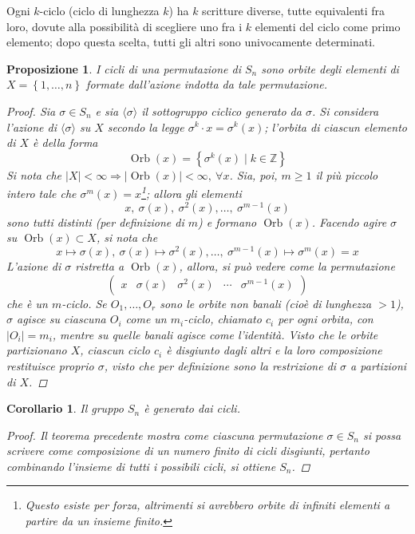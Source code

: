 \documentclass[11pt]{scrartcl}
\theoremstyle{style1}
\newtheorem{prop}{Proposizione}[section]
\newtheorem{corollario}{Corollario}[teorema]
\numberwithin{equation}{subsection}
\begin{document}
Ogni $k$-ciclo (ciclo di lunghezza $k$) ha $k$ scritture diverse, tutte equivalenti fra loro, dovute alla possibilit\`a di scegliere uno fra i $k$ elementi del ciclo come primo elemento; dopo questa scelta, tutti gli altri sono univocamente determinati.
\begin{prop}
	I cicli di una permutazione di $S_n$ sono orbite degli elementi di $X = \left\{ 1,\ldots,n \right\} $ formate dall'azione indotta da tale permutazione.
	\begin{proof}
		Sia $\sigma \in S_n$ e sia $\langle \sigma  \rangle$ il sottogruppo ciclico generato da $\sigma $.
		Si considera l'azione di $\langle \sigma  \rangle$ su $X$ secondo la legge $\sigma ^k \cdot x = \sigma ^k (x)$; l'orbita di ciascun elemento di $X$ \`e della forma
		\[
		\operatorname{Orb} (x) = \left\{ \sigma ^k(x)  \mid  k \in \mathbb{Z} \right\} 
		\] 
		Si nota che $\lvert X \rvert < \infty \Rightarrow  \lvert \operatorname{Orb} (x) \rvert < \infty, \ \forall x$. 
		Sia, poi, $m\ge 1$ il pi\`u piccolo intero tale che $\sigma ^m(x) = x$\footnote{Questo esiste per forza, altrimenti si avrebbero orbite di infiniti elementi a partire da un insieme finito.}; allora gli elementi 
		\[
		x, \ \sigma (x) , \ \sigma ^2 (x) , \ldots,\ \sigma ^{m-1} (x)
		\] 
		sono tutti distinti (per definizione di $m$) e formano $\operatorname{Orb} (x)$.
		Facendo agire $\sigma $ su $\operatorname{Orb} (x) \subset X$, si nota che 
		\[
		x \mapsto \sigma (x) , \ \sigma (x) \mapsto \sigma ^2(x) ,\ldots, \ \sigma ^{m-1} (x) \mapsto \sigma ^m(x) = x
		\] 
		L'azione di $\sigma $ ristretta a $\operatorname{Orb} (x)$, allora, si pu\`o vedere come la permutazione
		\[
			\begin{pmatrix} x & \sigma (x) & \sigma ^2 (x) & \cdots & \sigma ^{m-1} (x)\end{pmatrix} 
		\] 
		che \`e un $m$-ciclo. Se $O_1,\ldots,O_r$ sono le orbite non banali (cio\`e di lunghezza $>1$), $\sigma $ agisce su ciascuna $O_i$ come un $m_i$-ciclo, chiamato $c_i$ per ogni orbita, con $\lvert O_i \rvert = m_i$, mentre su quelle banali agisce come l'identit\`a.
Visto che le orbite partizionano $X$, ciascun ciclo $c_i$ \`e disgiunto dagli altri e la loro composizione restituisce proprio $\sigma $, visto che per definizione sono la restrizione di $\sigma $ a partizioni di $X$.
	\end{proof}
\end{prop}
\begin{corollario}\label{sncic}
	Il gruppo $S_n$ \`e generato dai cicli.
	\begin{proof}
		Il teorema precedente mostra come ciascuna permutazione $\sigma \in S_n$ si possa scrivere come composizione di un numero finito di cicli disgiunti, pertanto combinando l'insieme di tutti i possibili cicli, si ottiene $S_n$.
	\end{proof}
\end{corollario}
\end{document}
